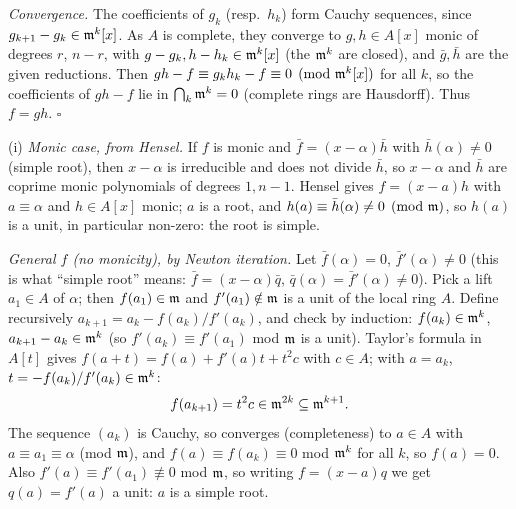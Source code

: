 \documentclass[11pt]{article}
\begin{document}
\emph{Convergence.} The coefficients of $g_k$ (resp.\ $h_k$) form Cauchy sequences, since $g_{k+1}-g_k\in\mathfrak m^k[x]$. As $A$ is complete, they converge to $g,h\in A[x]$ monic of degrees $r$, $n-r$, with $g-g_k,h-h_k\in\mathfrak m^k[x]$ (the $\mathfrak m^k$ are closed), and $\bar g,\bar h$ are the given reductions. Then $gh-f\equiv g_kh_k-f\equiv0\pmod{\mathfrak m^k[x]}$ for all $k$, so the coefficients of $gh-f$ lie in $\bigcap_k\mathfrak m^k=0$ (complete rings are Hausdorff). Thus $f=gh$. \hfill$\square$

\pf
(i) \emph{Monic case, from Hensel.} If $f$ is monic and $\bar f=(x-\alpha)\bar h$ with $\bar h(\alpha)\ne0$ (simple root), then $x-\alpha$ is irreducible and does not divide $\bar h$, so $x-\alpha$ and $\bar h$ are coprime monic polynomials of degrees $1,n-1$. Hensel gives $f=(x-a)h$ with $a\equiv\alpha$ and $h\in A[x]$ monic; $a$ is a root, and $h(a)\equiv\bar h(\alpha)\ne0\pmod{\mathfrak m}$, so $h(a)$ is a unit, in particular non-zero: the root is simple.

\emph{General $f$ (no monicity), by Newton iteration.} Let $\bar f(\alpha)=0$, $\bar f'(\alpha)\ne0$ (this is what ``simple root'' means: $\bar f=(x-\alpha)\bar q$, $\bar q(\alpha)=\bar f'(\alpha)\ne0$). Pick a lift $a_1\in A$ of $\alpha$; then $f(a_1)\in\mathfrak m$ and $f'(a_1)\notin\mathfrak m$ is a unit of the local ring $A$. Define recursively $a_{k+1}=a_k-f(a_k)/f'(a_k)$, and check by induction: $f(a_k)\in\mathfrak m^k$, $a_{k+1}-a_k\in\mathfrak m^k$ (so $f'(a_k)\equiv f'(a_1)$ mod $\mathfrak m$ is a unit). Taylor's formula in $A[t]$ gives $f(a+t)=f(a)+f'(a)t+t^2c$ with $c\in A$; with $a=a_k$, $t=-f(a_k)/f'(a_k)\in\mathfrak m^k$:
\[
f(a_{k+1})=t^2c\in\mathfrak m^{2k}\subseteq\mathfrak m^{k+1}.
\]
The sequence $(a_k)$ is Cauchy, so converges (completeness) to $a\in A$ with $a\equiv a_1\equiv\alpha$ (mod $\mathfrak m$), and $f(a)\equiv f(a_k)\equiv0$ mod $\mathfrak m^k$ for all $k$, so $f(a)=0$. Also $f'(a)\equiv f'(a_1)\not\equiv0$ mod $\mathfrak m$, so writing $f=(x-a)q$ we get $q(a)=f'(a)$ a unit: $a$ is a simple root.
\end{document}
